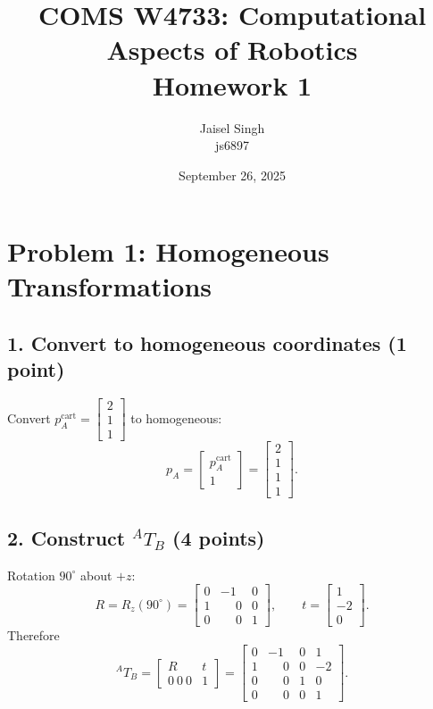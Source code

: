 \documentclass[11pt]{article}
\title{COMS W4733: Computational Aspects of Robotics\\Homework 1}
\author{Jaisel Singh \\ js6897}
\date{September 26, 2025}
\begin{document}
\maketitle

\section*{Problem 1: Homogeneous Transformations}

\subsection*{1. Convert to homogeneous coordinates (1 point)}
Convert $p_A^{\text{cart}} = \begin{bmatrix} 2 \\ 1 \\ 1 \end{bmatrix}$ to homogeneous:
\[
p_A = \begin{bmatrix} p_A^{\text{cart}} \\ 1 \end{bmatrix}
= \begin{bmatrix} 2 \\ 1 \\ 1 \\ 1 \end{bmatrix}.
\]

\subsection*{2. Construct $^{A}\!T_{B}$ (4 points)}
Rotation $90^\circ$ about $+z$:
\[
R = R_z(90^\circ) =
\begin{bmatrix}
0 & -1 & 0\\
1 & \phantom{-}0 & 0\\
0 & \phantom{-}0 & 1
\end{bmatrix},
\qquad
t = \begin{bmatrix} 1 \\ -2 \\ 0 \end{bmatrix}.
\]
Therefore
\[
^{A}\!T_{B}=\begin{bmatrix}R&t\\0~0~0&1\end{bmatrix}
=
\begin{bmatrix}
0 & -1 & 0 & 1\\
1 & \phantom{-}0 & 0 & -2\\
0 & \phantom{-}0 & 1 & 0\\
0 & \phantom{-}0 & 0 & 1
\end{bmatrix}.
\]
\end{document}
